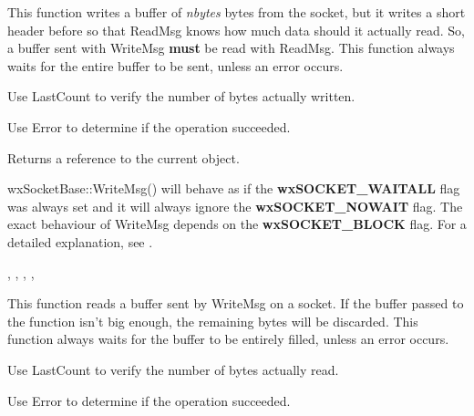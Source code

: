 
This function writes a buffer of {\it nbytes} bytes from the socket, but it
writes a short header before so that ReadMsg knows how much data should it
actually read. So, a buffer sent with WriteMsg {\bf must} be read with
ReadMsg. This function always waits for the entire buffer to be sent,
unless an error occurs.

Use LastCount to verify the number of bytes actually written.

Use Error to determine if the operation succeeded.





Returns a reference to the current object.


wxSocketBase::WriteMsg() will behave as if the {\bf wxSOCKET\_WAITALL} flag
was always set and it will always ignore the {\bf wxSOCKET\_NOWAIT} flag.
The exact behaviour of WriteMsg depends on the {\bf wxSOCKET\_BLOCK} flag.
For a detailed explanation, see .


, 
, 
, 
, 

%
%
\label{wxsocketbasereadmsg}


This function reads a buffer sent by WriteMsg on a socket. If the buffer passed
to the function isn't big enough, the remaining bytes will be discarded. This
function always waits for the buffer to be entirely filled, unless an error occurs.

Use LastCount to verify the number of bytes actually read.

Use Error to determine if the operation succeeded.


